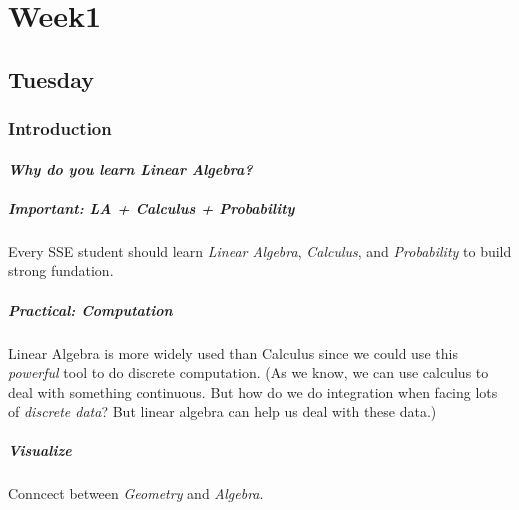 
\chapter{Week1}

\section{Tuesday}

\subsection{Introduction}
\subsubsection{\textit{Why do you learn Linear Algebra?}}
\paragraph{Important: LA + Calculus + Probability}

Every SSE student should learn {\emph{Linear Algebra}}, {\emph{Calculus}}, and {\emph{Probability}} to build strong fundation.

\paragraph{Practical: Computation}

Linear Algebra is more widely used than Calculus since we could use this {\emph{powerful}} tool to do discrete computation. (As we know, we can use calculus to deal with something continuous. But how do we do integration when facing lots of \emph{discrete data}? But linear algebra can help us deal with these data.)

\paragraph{Visualize} 

Conncect between \emph{Geometry} and \emph{Algebra}.

